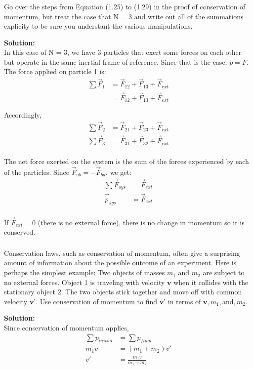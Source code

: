 \documentclass{article}
\newcommand\Problem{%
    \subsubsection{}%
}
\newcommand\TheSolution{%
  \textbf{Solution:}\\%
}
\begin{document}
\Problem Go over the steps from Equation (1.25) to (1.29) in the proof of conservation of momentum, but treat the case that N = 3 and write out all of the summations explicity to be sure you understant the various manipulations.

\TheSolution In this case of N = 3, we have 3 particles that exert some forces on each other but operate in the same inertial frame of reference. Since that is the case, $\dot{p} = F$. The force applied on particle 1 is:
\begin{equation}
    \begin{aligned}
        \sum \vec{F}_1 & = \vec{F}_12 + \vec{F}_13 + \vec{F}_{ext} \\
                       & = \vec{F}_12 + \vec{F}_13 + \vec{F}_{ext}
    \end{aligned}
\end{equation}

Accordingly,
\begin{equation}
    \begin{aligned}
        \sum \vec{F}_2 & = \vec{F}_21 + \vec{F}_23 + \vec{F}_{ext} \\
        \sum \vec{F}_3 & = \vec{F}_31 + \vec{F}_32 + \vec{F}_{ext} \\
    \end{aligned}
\end{equation}

The net force exerted on the system is the sum of the forces experienced by each of the particles. Since $\vec{F}_{ab} = -\vec{F}_{ba}$, we get:
\begin{equation}
    \begin{aligned}
        \sum \vec{F}_{sys}  & = \vec{F}_{ext} \\
        \vec{\dot{p}}_{sys} & = \vec{F}_{ext} \\
    \end{aligned}
\end{equation}

If $\vec{F}_{ext} = 0$ (there is no external force), there is no change in momentum so it is conserved.

\Problem
Conservation laws, such as conservation of momentum, often give a surprising amount of information about the possible outcome of an experiment. Here is perhaps the simplest example: Two objects of masses $m_1$ and $m_2$ are subject to no external forces. Object 1 is traveling with velocity $\textbf{v}$ when it collides with the stationary object 2. The two objects stick together and move off with common velocity $\textbf{v'}$. Use conservation of momentum to find $\textbf{v'}$ in terms of $\textbf{v}, \textit{m}_1, \text{and}, \textit{m}_2$.

\TheSolution Since conservation of momentum applies,
\begin{equation}
    \begin{aligned}
        \sum p_{initial} & = \sum p_{final}          \\
        m_1 v            & = (m_1 + m_2) v'          \\
        v'               & = \frac{m_1 v}{m_1 + m_2}
    \end{aligned}
\end{equation}
\end{document}
